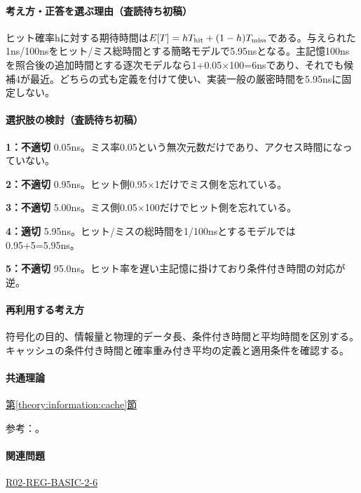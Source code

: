 \paragraph{考え方・正答を選ぶ理由（査読待ち初稿）} ヒット確率hに対する期待時間は\(E[T]=hT_{\rm hit}+(1-h)T_{\rm miss}\)である。与えられた1ns/100nsをヒット/ミス総時間とする簡略モデルで5.95nsとなる。主記憶100nsを照合後の追加時間とする逐次モデルなら1+0.05×100=\allowbreak{}6nsであり、それでも候補4が最近。どちらの式も定義を付けて使い、実装一般の厳密時間を5.95nsに固定しない。

\paragraph{選択肢の検討（査読待ち初稿）}\mbox{}\par

\noindent\textbf{1：不適切} 0.05ns。ミス率0.05という無次元数だけであり、アクセス時間になっていない。\par

\noindent\textbf{2：不適切} 0.95ns。ヒット側0.95×1だけでミス側を忘れている。\par

\noindent\textbf{3：不適切} 5.00ns。ミス側0.05×100だけでヒット側を忘れている。\par

\noindent\textbf{4：適切} 5.95ns。ヒット/ミスの総時間を1/100nsとするモデルでは0.95+5=\allowbreak{}5.95ns。\par

\noindent\textbf{5：不適切} 95.0ns。ヒット率を遅い主記憶に掛けており条件付き時間の対応が逆。\par

\paragraph{再利用する考え方} 符号化の目的、情報量と物理的データ長、条件付き時間と平均時間を区別する。キャッシュの条件付き時間と確率重み付き平均の定義と適用条件を確認する。

\paragraph{共通理論} \hyperref[theory:information:cache]{第\ref*{theory:information:cache}節}

\par 参考：\cite{info_cache}。

\paragraph{関連問題} \hyperref[q:r02-reg-basic-2-6]{R02-REG-BASIC-2-6}

